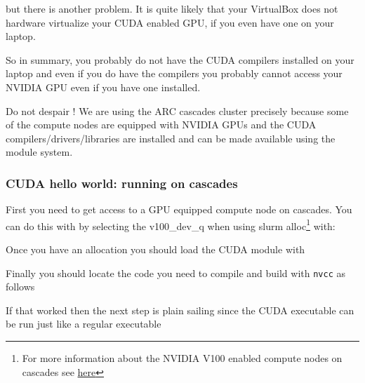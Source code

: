 
but there is another problem. It is quite likely that your VirtualBox does not hardware virtualize your CUDA enabled GPU, if you even have one on your laptop.

So in summary, you probably do not have the CUDA compilers installed on your laptop and even if you do have the compilers you probably cannot access your NVIDIA GPU even if you have one installed.

Do not despair ! We are using the ARC cascades cluster precisely because some of the compute nodes are equipped with NVIDIA GPUs and the CUDA compilers/drivers/libraries are installed and can be made available using the module system.

\subsubsection{CUDA hello world: running on cascades}

First you need to get access to a GPU equipped compute node on cascades. You can do this with by selecting the v100\_dev\_q when using slurm alloc\footnote{For more information about the NVIDIA V100 enabled compute nodes on cascades see \href{https://www.arc.vt.edu/computing/cascades/}{here}} with:


Once you have an allocation you should load the CUDA module with


Finally you should locate the code you need to compile and build with \texttt{nvcc} as follows


If that worked then the next step is plain sailing since the CUDA executable can be run just like a regular executable


